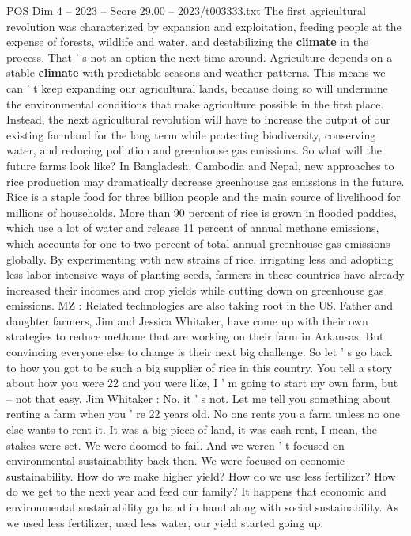 \begin{textsample}{POS Dim 4 – 2023 – Score 29.00 – 2023/t003333.txt}
The first agricultural revolution was characterized by expansion and exploitation, feeding people at the expense of forests, wildlife and water, and destabilizing the \textbf{climate} in the process.
That ' s not an option the next time around.
Agriculture depends on a stable \textbf{climate} with predictable seasons and weather patterns.
This means we can ' t keep expanding our agricultural lands, because doing so will undermine the environmental conditions that make agriculture possible in the first place.
Instead, the next agricultural revolution will have to increase the output of our existing farmland for the long term while protecting biodiversity, conserving water, and reducing pollution and greenhouse gas emissions.
So what will the future farms look like?
In Bangladesh, Cambodia and Nepal, new approaches to rice production may dramatically decrease greenhouse gas emissions in the future.
Rice is a staple food for three billion people and the main source of livelihood for millions of households.
More than 90 percent of rice is grown in flooded paddies, which use a lot of water and release 11 percent of annual methane emissions, which accounts for one to two percent of total annual greenhouse gas emissions globally.
By experimenting with new strains of rice, irrigating less and adopting less labor-intensive ways of planting seeds, farmers in these countries have already increased their incomes and crop yields while cutting down on greenhouse gas emissions.
MZ : Related technologies are also taking root in the US.
Father and daughter farmers, Jim and Jessica Whitaker, have come up with their own strategies to reduce methane that are working on their farm in Arkansas.
But convincing everyone else to change is their next big challenge.
So let ' s go back to how you got to be such a big supplier of rice in this country.
You tell a story about how you were 22 and you were like, I ' m going to start my own farm, but -- not that easy.
Jim Whitaker : No, it ' s not.
Let me tell you something about renting a farm when you ' re 22 years old.
No one rents you a farm unless no one else wants to rent it.
It was a big piece of land, it was cash rent, I mean, the stakes were set.
We were doomed to fail.
And we weren ' t focused on environmental sustainability back then.
We were focused on economic sustainability.
How do we make higher yield?
How do we use less fertilizer?
How do we get to the next year and feed our family?
It happens that economic and environmental sustainability go hand in hand along with social sustainability.
As we used less fertilizer, used less water, our yield started going up.

\end{textsample}
